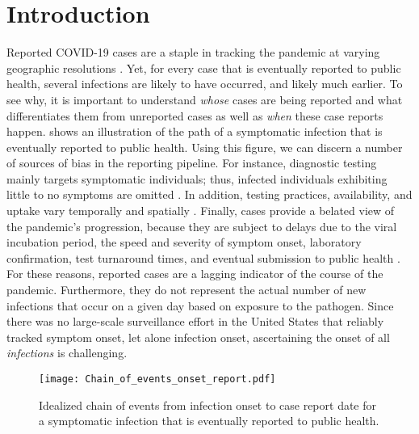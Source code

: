 \section{Introduction}
\label{sec:intro}

Reported COVID-19 cases are a staple in tracking the pandemic at varying
geographic resolutions \citep{dong2020interactive, nyt2020corona,
wp2020tracking}. Yet, for every case that is eventually reported to public
health, several infections are likely to have occurred, and likely much earlier. To
see why, it is important to understand \emph{whose} cases are being reported and
what differentiates them from unreported cases as well as \emph{when} these
case reports happen.  shows an
illustration of the path of a symptomatic infection that is eventually
reported to public health. Using this figure, we can discern a number of sources
of bias in the reporting pipeline. For instance, diagnostic testing mainly
targets symptomatic individuals; thus, infected individuals exhibiting little to
no symptoms are omitted \citep{cdc2022estimated}. In addition, testing
practices, availability, and uptake vary temporally and spatially
\citep{pitzer2021impact, ecdc2020strategies, hitchings2021usefulness}. Finally,
cases provide a belated view of the pandemic's progression, because they are
subject to delays due to the viral incubation period, the speed and severity of
symptom onset, laboratory confirmation, test turnaround times, and eventual
submission to public health \citep{pellis2021challenges, wash2020dash}. For
these reasons, reported cases are a lagging indicator of the course of the
pandemic. Furthermore, they do not represent the actual number of new infections
that occur on a given day based on exposure to the pathogen. Since there
was no large-scale surveillance effort in the United States that reliably
tracked symptom onset, let alone infection onset, ascertaining the onset of all
\emph{infections} is challenging.

\begin{figure}[!tb]
\centering
    \texttt{[image: Chain\_of\_events\_onset\_report.pdf]} 
    \caption{Idealized chain of events from infection onset to case report date 
    for a symptomatic infection that is eventually reported to public health.}
    \label{fig:chain_events_onset_report}
\end{figure}


